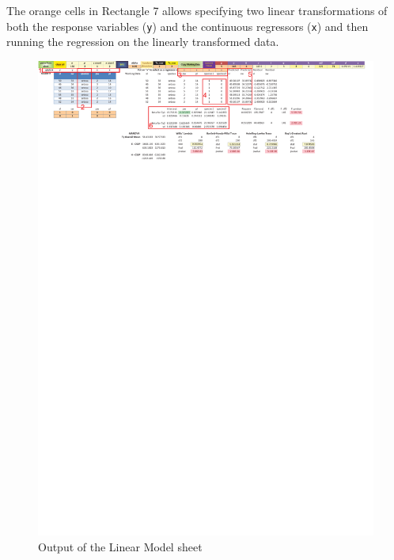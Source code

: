 \documentclass[article]{jss}
\numberwithin{equation}{subsection}
\begin{document}
        The orange cells in Rectangle 7 allows specifying two linear transformations of both the response variables (\texttt{y}) and the continuous regressors (\texttt{x}) and then running the regression on the linearly transformed data.
        \begin{figure}[!tbh]
                \centering
                \includegraphics[width=\linewidth, keepaspectratio=true]{img/LMSheetOutput_markup}
                \vspace{-20pt}\centering{}\protect\caption{Output of the Linear Model sheet}\label{fig:LMSheetOutput_markup}
        \end{figure}
        
        
        
\end{document}
